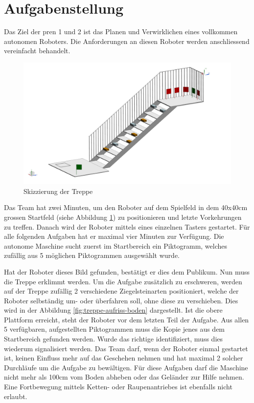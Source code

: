 \newpage
\section{Aufgabenstellung}

Das Ziel der \acrfull{pren} 1 und 2 ist das Planen und Verwirklichen eines vollkommen autonomen Roboters. Die Anforderungen an diesen Roboter werden anschliessend vereinfacht behandelt. 
 
\begin{figure}[H]
  \includegraphics[width=1\textwidth]{img/Aufgabenstellung.png}
  \centering
  \caption{Skizzierung der Treppe}
  \label{fig:seitenansicht-treppe}
\end{figure}
 
Das Team hat zwei Minuten, um den Roboter auf dem Spielfeld in dem 40x40cm grossen 
Startfeld (siehe Abbildung \ref{fig:seitenansicht-treppe}) zu positionieren und letzte Vorkehrungen zu treffen. Danach wird der Roboter mittels eines einzelnen Tasters gestartet. 
Für alle folgenden Aufgaben hat er maximal vier Minuten zur Verfügung. 
Die autonome Maschine sucht zuerst im Startbereich ein Piktogramm, welches zufällig aus 5 möglichen Piktogrammen ausgewählt wurde.

\newpage

Hat der Roboter dieses Bild gefunden, bestätigt er dies dem Publikum. Nun muss die Treppe erklimmt werden. Um die Aufgabe zusätzlich zu erschweren, werden auf der Treppe zufällig 2 verschiedene Ziegelsteinarten positioniert, welche der Roboter selbständig um- oder überfahren soll, ohne diese zu verschieben. Dies wird in der Abbildung \ref{fig:treppe-aufriss-boden} dargestellt. Ist die obere Plattform erreicht, steht der Roboter vor dem letzten Teil der Aufgabe. Aus allen 5 verfügbaren, aufgestellten Piktogrammen muss die Kopie jenes aus dem Startbereich gefunden werden. Wurde das richtige identifiziert, muss dies wiederum signalisiert werden. Das Team darf, wenn der Roboter einmal gestartet ist, keinen Einfluss mehr auf das Geschehen nehmen und hat maximal 2 solcher Durchläufe 
um die Aufgabe zu bewältigen. Für diese Aufgaben darf die Maschine nicht mehr als 100cm vom Boden abheben oder das Geländer zur Hilfe nehmen. Eine Fortbewegung mittels Ketten- oder Raupenantriebes ist ebenfalls nicht erlaubt.

